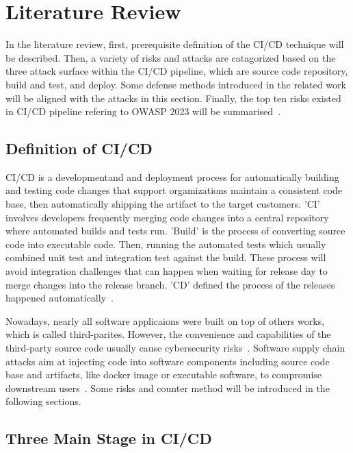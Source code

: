 \section{Literature Review}
In the literature review, first, prerequisite definition of the CI/CD technique will be 
described. Then, a variety of risks and attacks are catagorized based on the three attack 
surface within the CI/CD pipeline, which are source code repository, build and test, and deploy.
Some defense methods introduced in the related work will be aligned with the attacks in this 
section. Finally, the top ten risks existed in CI/CD pipeline refering to OWASP 2023 will be 
summarised~\cite{OWASP2023}.

\subsection{Definition of CI/CD}
CI/CD is a developmentand and deployment process for automatically building and testing code
changes that support orgamizations maintain a consistent code base, then automatically shipping 
the artifact to the target customers. 'CI' involves developers frequently merging code changes 
into a central repository where automated builds and tests run. 'Build' is the process of 
converting source code into executable code. Then, running the automated tests which usually 
combined unit test and integration test against the build. These process will avoid integration 
challenges that can happen when waiting for release day to merge changes into the release branch. 
'CD' defined the process of the releases happened automatically~\cite{DoDDefCI/CD2023}. 

Nowadays, nearly all software applicaions were built on top of others works, which is called third-parites.
However, the convenience and capabilities of the third-party source code usually cause cybersecurity 
risks~\cite{mastrangelo2015use}. Software supply chain attacks aim at injecting code into software
components including source code base and artifacts, like docker image or executable software,
to compromise downstream users~\cite{ladisa2023sok}. 
Some risks and counter method will be introduced in the following sections.

\subsection{Three Main Stage in CI/CD}

